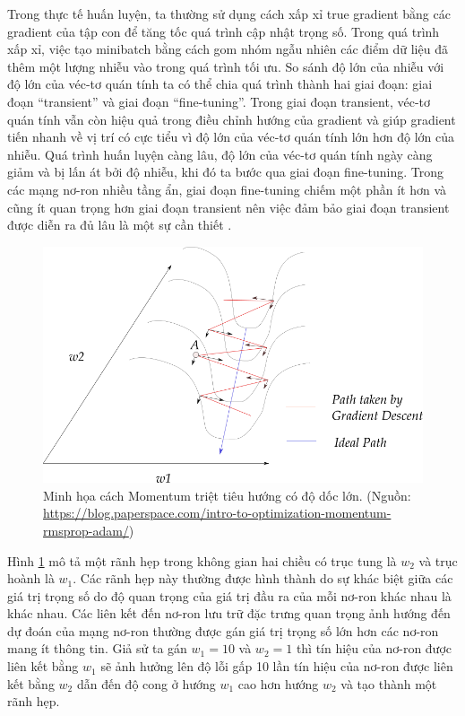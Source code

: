 Trong thực tế huấn luyện, ta thường sử dụng cách xấp xỉ true gradient bằng các gradient của tập con để tăng tốc quá trình cập nhật trọng số. Trong quá trình xấp xỉ, việc tạo minibatch bằng cách gom nhóm ngẫu nhiên các điểm dữ liệu đã thêm một lượng nhiễu vào trong quá trình tối ưu. So sánh độ lớn của nhiễu với độ lớn của véc-tơ quán tính ta có thể chia quá trình thành hai giai đoạn: giai đoạn ``transient'' và giai đoạn ``fine-tuning''. Trong giai đoạn transient, véc-tơ quán tính vẫn còn hiệu quả trong điều chỉnh hướng của gradient và giúp gradient tiến nhanh về vị trí có cực tiểu vì độ lớn của véc-tơ quán tính lớn hơn độ lớn của nhiễu. Quá trình huấn luyện càng lâu, độ lớn của véc-tơ quán tính ngày càng giảm và bị lấn át bởi độ nhiễu, khi đó ta bước qua giai đoạn fine-tuning. Trong các mạng nơ-ron nhiều tầng ẩn, giai đoạn fine-tuning chiếm một phần ít hơn và cũng ít quan trọng hơn giai đoạn transient nên việc đảm bảo giai đoạn transient được diễn ra đủ lâu là một sự cần thiết \cite{sutskever2013onti}.

\begin{figure}[htp]
	\centering
	\includegraphics[width=140 mm]{images/valley-momentum.png}
	\caption{Minh họa cách Momentum triệt tiêu hướng có độ dốc lớn. (Nguồn: \url{https://blog.paperspace.com/intro-to-optimization-momentum-rmsprop-adam/})}
	\label{fig:valley-momentum}
\end{figure}

Hình \ref{fig:valley-momentum} mô tả một rãnh hẹp trong không gian hai chiều có trục tung là $w_2$ và trục hoành là $w_1$. Các rãnh hẹp này thường được hình thành do sự khác biệt giữa các giá trị trọng số do độ quan trọng của giá trị đầu ra của mỗi nơ-ron khác nhau là khác nhau. Các liên kết đến nơ-ron lưu trữ đặc trưng quan trọng ảnh hướng đến dự đoán của mạng nơ-ron thường được gán giá trị trọng số lớn hơn các nơ-ron mang ít thông tin. Giả sử ta gán $w_1 = 10$ và $w_2 = 1$ thì tín hiệu của nơ-ron được liên kết bằng $w_1$ sẽ ảnh hưởng lên độ lỗi gấp 10 lần tín hiệu của nơ-ron được liên kết bằng $w_2$ dẫn đến độ cong ở hướng $w_1$ cao hơn hướng $w_2$ và tạo thành một rãnh hẹp.

